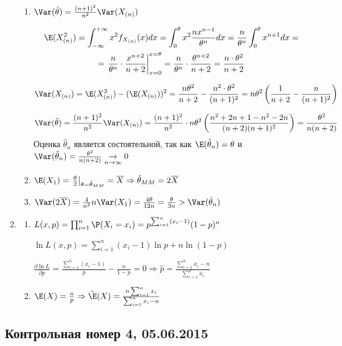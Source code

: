 \begin{enumerate}
\begin{enumerate}
\item $\Var(\hat{\theta}) = \frac{(n+1)^2}{n^2} \Var(X_{(n)})$

\begin{multline*}
\E(X_{(n)}^2) = \int_{-\infty}^{+\infty} x^2 f_{X_{(n)}} (x) dx = \int_{0}^{\theta} x^2 \frac{nx^{n-1}}{\theta^n}  dx = \frac{n}{\theta^n}  \int_{0}^{\theta} x^{n+1} dx = \\
= \left. \frac{n}{\theta^n} \cdot \frac{x^{n+2}}{n+2} \right|_{x=0}^{x=\theta} = \frac{n}{\theta^n} \cdot  \frac{\theta^{n+2}}{n+2} = \frac{n\cdot\theta^2}{n+2}
\end{multline*}

\[
\Var(X_{(n)}) = \E(X_{(n)}^2)  - (\E(X_{(n)}))^2 = \frac{n\theta^2}{n+2} - \frac{n^2 \cdot \theta^2}{(n+1)^2} = n\theta^2 \left(\frac{1}{n+2} - \frac{n}{(n+1)^2}\right)
\]

\[
\Var(\tilde{\theta}) = \frac{(n+1)^2}{n^2} \Var(X_{(n)}) = \frac{(n+1)^2}{n^2}  \cdot n\theta^2 \left(\frac{n^2+2n+1 - n^2-2n}{(n+2)(n+1)^2} \right) = \frac{\theta^2}{n(n+2)}
\]
Оценка $\hat{\theta}_n$ является состоятельной, так как $\E(\hat{\theta}_n) = \theta$ и $\Var(\hat{\theta}_n) = \frac{\theta^2}{n(n+2)} \underset{n \to \infty}{\to} 0$

\item $\E(X_1) = \left. \frac{\theta}{2} \right|_{\theta = \hat{\theta}_{MM}} = \overline{X} \Rightarrow \hat{\theta}_{MM} = 2\overline{X}$
\item $\Var(2\overline{X}) = \frac{4}{n^2}n\Var(X_1) = \frac{4\theta}{12n} = \frac{\theta}{3n} > \Var(\hat{\theta}_n)$
\end{enumerate}
\item
\begin{enumerate}
\item $L(x, p) = \prod_{i=1}^n \P(X_i = x_i) = p^{\sum_{i=1}^n(x_i-1)} (1-p)^n$

$\ln L (x, p) = \sum_{i=1}^n(x_i-1) \ln p  + n\ln(1-p)$

$\frac{\partial \ln L}{\partial p} = \frac{\sum_{i=1}^n(x_i-1)}{p} - \frac{n}{1-p} = 0 \Rightarrow \hat{p} = \frac{\sum_{i=1}^n x_i - n}{\sum_{i=1}^n x_i}$
\item $\E(X) = \frac{n}{p} \Rightarrow \hat{\E}(X) = \frac{n\sum_{i=1}^n x_i}{\sum_{i=1}^n x_i - n}$
\end{enumerate}
\end{enumerate}


\subsection{Контрольная номер 4, 05.06.2015}

